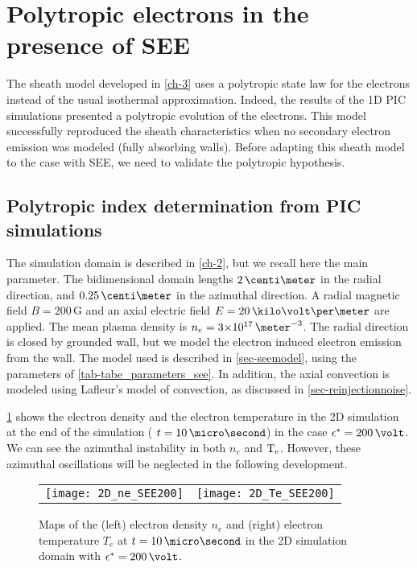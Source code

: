 

\section{Polytropic electrons in the presence of \acs{SEE}}
\label{sec-PIC_poly}

The sheath model developed in \cref{ch-3} uses a polytropic state law for the electrons instead of the usual isothermal approximation.
Indeed, the results of the  \ac{1D} \ac{PIC} simulations presented a polytropic evolution of the electrons.
This model successfully reproduced the sheath characteristics  when no secondary electron emission was modeled (fully absorbing walls).
Before adapting this sheath model to the case with \ac{SEE}, we need to validate the polytropic hypothesis.


\subsection{Polytropic index determination from PIC simulations} \label{subsec-fluid_see_polyfit}


The simulation domain is described in \cref{ch-2}, but we recall here the main parameter.
The bidimensional domain lengths $2\,\centi\meter$ in the radial direction, and $0.25\,\centi\meter$ in the azimuthal direction.
A radial magnetic field $B=200\,$G and an axial electric field $E=20\,\kilo\volt\per\meter$ are applied.
The mean plasma density is $n_e = \sn{3}{17}\,\meter^{-3}$.
The radial direction is closed by grounded wall, but we model the electron induced electron emission from the wall.
The model used is described in \cref{sec-seemodel}, using the parameters of \cref{tab-tabe_parameters_see}.
In addition, the axial convection is modeled using Lafleur's model of convection, as discussed in \cref{sec-reinjectionnoise}.

\cref{fig-2DneTe} shows the electron density and the electron temperature in the \ac{2D} simulation at the end of the simulation ( $t=10\,\micro\second$) in the case $\crover=200\,\volt$.
We can see the azimuthal instability in both $n_e$ and $\mathrm{T_e}$.
However, these azimuthal oscillations will be neglected in the following development. 

\begin{figure}[!htb]
  \centering
  \begin{tabular}{@{} c c}
    \texttt{[image: 2D\_ne\_SEE200]} &
    \texttt{[image: 2D\_Te\_SEE200]} \\
  \end{tabular}
  \caption{Maps of the (left) electron density $n_e$ and (right) electron temperature $T_e$ at $t=10\,\micro\second$ in the \acs{2D} simulation domain with $\crover=200\,\volt$.}
  \label{fig-2DneTe}
\end{figure}



